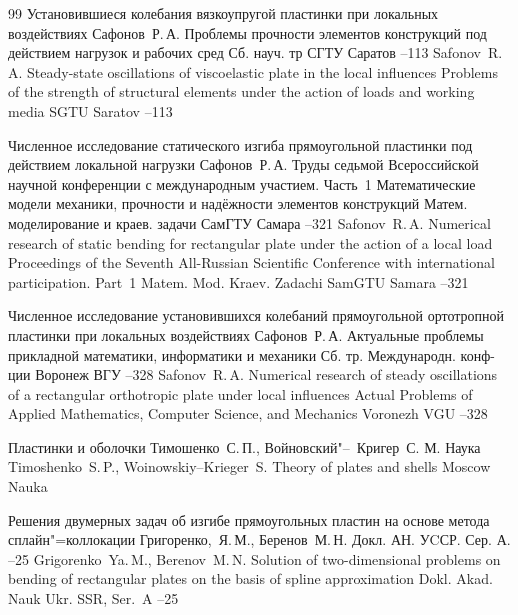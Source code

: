 \begin{thebibliography}{99}
\paper Установившиеся колебания вязкоупругой пластинки при локальных воздействиях
\by Сафонов~Р.\,А.
\inbook Проблемы прочности элементов конструкций под действием нагрузок и рабочих сред
\bookinfo Сб. науч. тр
\publ СГТУ
\publaddr Саратов
--113
\misctransl 
\by Safonov~R.\,A.
\paper Steady-state oscillations of viscoelastic plate in the local influences
\inbook Problems of the strength of structural elements under the action of loads and working media
\publ SGTU
\publaddr Saratov
--113


\paper Численное исследование статического изгиба прямоугольной пластинки под действием локальной нагрузки 
\by Сафонов~Р.\,А.
\book Труды седьмой Всероссийской научной конференции с международным участием. \rm Часть~1
\bookinfo Математические модели механики, прочности и надёжности элементов конструкций
\serial Матем. моделирование и краев. задачи
\publ СамГТУ
\publaddr Самара
--321
\misctransl
\by Safonov~R.\,A.
\paper Numerical research of static bending for  rectangular plate under the action of a local load
\book Proceedings of the Seventh All-Russian Scientific Conference with international participation. \rm Part~1
\serial Matem. Mod. Kraev. Zadachi
\publ SamGTU
\publaddr Samara
--321


\paper Численное исследование установившихся колебаний прямоугольной ортотропной пластинки при локальных воздействиях 
\by Сафонов~Р.\,А.
\inbook Актуальные проблемы прикладной математики, информатики и механики
\bookinfo Сб. тр. Международн. конф-ции
\publaddr Воронеж
\publ ВГУ
--328
\misctransl 
\by Safonov~R.\,A.
\paper Numerical research of steady oscillations of a rectangular orthotropic plate under local influences
\inbook Actual Problems of Applied Mathematics, Computer Science, and Mechanics
\publaddr Voronezh
\publ VGU
--328

\paper Пластинки и оболочки
\by Тимошенко~С.\,П., Войновский"--~Кригер~С.
\publaddr М.
\publ Наука
\misctransl
\by Timoshenko~S.\,P., Woinowskiy--Krieger~S.
\book Theory of plates and shells
\publaddr Moscow
\publ Nauka

\paper Решения двумерных задач об изгибе прямоугольных пластин на основе метода сплайн"=коллокации
\by Григоренко,~Я.\,М., Беренов~М.\,Н.
\jour Докл. АН. УCСР. Сер. А.
--25
\misctransl
\by Grigorenko~Ya.\,M., Berenov~M.\,N.
\paper Solution of two-dimensional problems on bending of rectangular plates on the basis of spline approximation
\jour Dokl. Akad. Nauk Ukr. SSR, Ser.~A
--25


\end{thebibliography}
